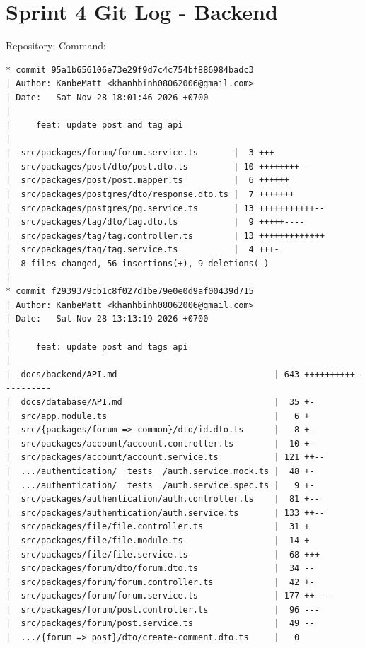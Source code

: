 \documentclass[12pt]{article}
\begin{document}

\section{Sprint 4 Git Log - Backend}

Repository: \texttt{} Command: \texttt{}

\begin{lstlisting}[numbers=none,breaklines=true]
* commit 95a1b656106e73e29f9d7c4c754bf886984badc3
| Author: KanbeMatt <khanhbinh08062006@gmail.com>
| Date:   Sat Nov 28 18:01:46 2026 +0700
|
|     feat: update post and tag api
|
|  src/packages/forum/forum.service.ts       |  3 +++
|  src/packages/post/dto/post.dto.ts         | 10 ++++++++--
|  src/packages/post/post.mapper.ts          |  6 ++++++
|  src/packages/postgres/dto/response.dto.ts |  7 +++++++
|  src/packages/postgres/pg.service.ts       | 13 +++++++++++--
|  src/packages/tag/dto/tag.dto.ts           |  9 +++++----
|  src/packages/tag/tag.controller.ts        | 13 +++++++++++++
|  src/packages/tag/tag.service.ts           |  4 +++-
|  8 files changed, 56 insertions(+), 9 deletions(-)
|
* commit f2939379cb1c8f027d1be79e0e0d9af00439d715
| Author: KanbeMatt <khanhbinh08062006@gmail.com>
| Date:   Sat Nov 28 13:13:19 2026 +0700
|
|     feat: update post and tags api
|
|  docs/backend/API.md                               | 643 ++++++++++----------
|  docs/database/API.md                              |  35 +-
|  src/app.module.ts                                 |   6 +
|  src/{packages/forum => common}/dto/id.dto.ts      |   8 +-
|  src/packages/account/account.controller.ts        |  10 +-
|  src/packages/account/account.service.ts           | 121 ++--
|  .../authentication/__tests__/auth.service.mock.ts |  48 +-
|  .../authentication/__tests__/auth.service.spec.ts |   9 +-
|  src/packages/authentication/auth.controller.ts    |  81 +--
|  src/packages/authentication/auth.service.ts       | 133 ++--
|  src/packages/file/file.controller.ts              |  31 +
|  src/packages/file/file.module.ts                  |  14 +
|  src/packages/file/file.service.ts                 |  68 +++
|  src/packages/forum/dto/forum.dto.ts               |  34 --
|  src/packages/forum/forum.controller.ts            |  42 +-
|  src/packages/forum/forum.service.ts               | 177 ++----
|  src/packages/forum/post.controller.ts             |  96 ---
|  src/packages/forum/post.service.ts                |  49 --
|  .../{forum => post}/dto/create-comment.dto.ts     |   0

\end{lstlisting}
\end{document}

